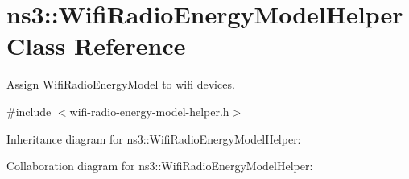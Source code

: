 \hypertarget{classns3_1_1WifiRadioEnergyModelHelper}{}\section{ns3\+:\+:Wifi\+Radio\+Energy\+Model\+Helper Class Reference}
\label{classns3_1_1WifiRadioEnergyModelHelper}


Assign \hyperlink{classns3_1_1WifiRadioEnergyModel}{Wifi\+Radio\+Energy\+Model} to wifi devices.  




{\ttfamily \#include $<$wifi-\/radio-\/energy-\/model-\/helper.\+h$>$}



Inheritance diagram for ns3\+:\+:Wifi\+Radio\+Energy\+Model\+Helper\+:


Collaboration diagram for ns3\+:\+:Wifi\+Radio\+Energy\+Model\+Helper\+:
